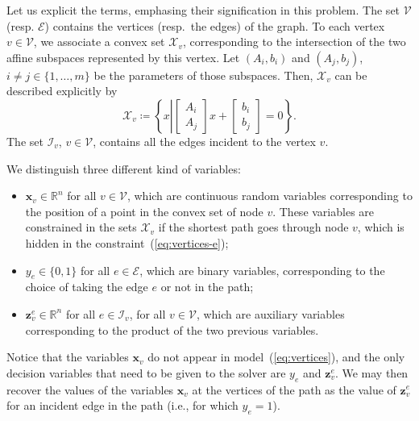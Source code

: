 \documentclass[a4paper, 12pt]{article}
\begin{document}
Let us explicit the terms, emphasing their signification in this problem. The set $\mathcal{V}$ (resp. $\mathcal{E}$) contains the vertices (resp.~the edges) of the graph. To each vertex $v \in \mathcal{V}$, we associate a convex set $\mathcal{X}_v$, corresponding to the intersection of the two affine subspaces represented by this vertex. Let $(A_i, b_i)$ and $(A_j, b_j)$, $i \neq j \in \{1, \dots, m\}$ be the parameters of those subspaces. Then, $\mathcal{X}_v$ can be described explicitly by \[\mathcal{X}_v \coloneq \left\{x \left\lvert \begin{bmatrix} A_i \\ A_j \end{bmatrix} x + \begin{bmatrix} b_i \\ b_j \end{bmatrix} = 0 \right.\right\}.\] The set $\mathcal{I}_v$, $v \in \mathcal{V}$, contains all the edges incident to the vertex $v$.

We distinguish three different kind of variables:
\begin{itemize}
    \item $\mathbf{x}_v \in \mathbb{R}^n$ for all $v \in \mathcal{V}$, which are continuous random variables corresponding to the position of a point in the convex set of node $v$. These variables are constrained in the sets $\mathcal{X}_v$ if the shortest path goes through node $v$, which is hidden in the constraint~(\ref{eq:vertices-e});
    \item $y_e \in \{0,1\}$ for all $e \in \mathcal{E}$, which are binary variables, corresponding to the choice of taking the edge $e$ or not in the path;
    \item $\mathbf{z}_v^e \in \mathbb{R}^n$ for all $e \in \mathcal{I}_v$, for all $v \in \mathcal{V}$, which are auxiliary variables corresponding to the product of the two previous variables.
\end{itemize}
Notice that the variables $\mathbf{x}_v$ do not appear in model~(\ref{eq:vertices}), and the only decision variables that need to be given to the solver are $y_e$ and $\mathbf{z}_v^e$. We may then recover the values of the variables $\mathbf{x}_v$ at the vertices of the path as the value of $\mathbf{z}_v^e$ for an incident edge in the path (i.e., for which $y_e = 1$).
\end{document}
